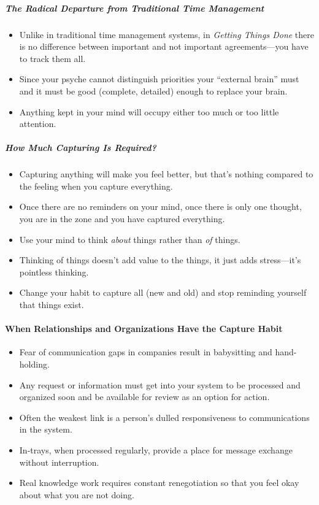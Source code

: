 \documentclass{article}
\begin{document}
\subparagraph{The Radical Departure from Traditional Time Management}

\begin{itemize}
 \item Unlike in traditional time management systems, in \textit{Getting Things Done} there is no difference between important and not important agreements---you have to track them all.
 \item Since your psyche cannot distinguish priorities your ``external brain'' must and it must be good (complete, detailed) enough to replace your brain.
 \item Anything kept in your mind will occupy either too much or too little attention.
\end{itemize}

\subparagraph{How Much Capturing Is Required?}

\begin{itemize}
 \item Capturing anything will make you feel better, but that's nothing compared to the feeling when you capture everything.
 \item Once there are no reminders on your mind, once there is only one thought, you are in the zone and you have captured everything.
 \item Use your mind to think \emph{about} things rather than \emph{of} things.
 \item Thinking of things doesn't add value to the things, it just adds stress---it's pointless thinking.
 \item Change your habit to capture all (new and old) and stop reminding yourself that things exist.
\end{itemize}

\paragraph{When Relationships and Organizations Have the Capture Habit}

\begin{itemize}
 \item Fear of communication gaps in companies result in babysitting and hand-holding.
 \item Any request or information must get into your system to be processed and organized soon and be available for review as an option for action.
 \item Often the weakest link is a person's dulled responsiveness to communications in the system.
 \item In-trays, when processed regularly, provide a place for message exchange without interruption.
 \item Real knowledge work requires constant renegotiation so that you feel okay about what you are not doing.
\end{itemize}
\end{document}
